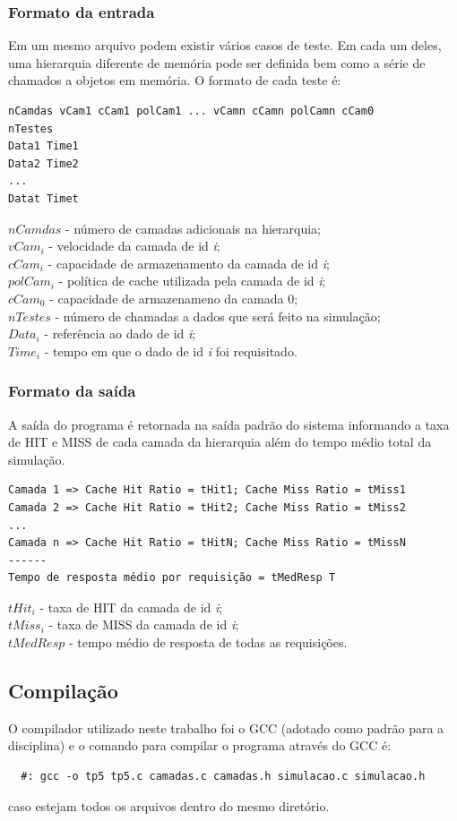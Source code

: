\documentclass[12pt]{article}
\begin{document}
\subsubsection{Formato da entrada}
Em um mesmo arquivo podem existir vários casos de teste. Em cada um deles, uma hierarquia diferente de memória pode ser definida bem como a série de chamados a objetos em memória. O formato de cada teste é:
\begin{verbatim}
nCamdas vCam1 cCam1 polCam1 ... vCamn cCamn polCamn cCam0
nTestes
Data1 Time1
Data2 Time2
...
Datat Timet
\end{verbatim}$nCamdas$ - número de camadas adicionais na hierarquia; \\
$vCam_{i}$ - velocidade da camada de id \textit{i}; \\
$cCam_{i}$ - capacidade de armazenamento da camada de id \textit{i}; \\
$polCam_{i}$ - política de cache utilizada pela camada de id \textit{i}; \\
$cCam_{0}$ - capacidade de armazenameno da camada 0; \\
$nTestes$ - número de chamadas a dados que será feito na simulação; \\
$Data_{i}$ - referência ao dado de id \textit{i}; \\
$Time_{i}$ - tempo em que o dado de id \textit{i} foi requisitado.

\subsubsection{Formato da saída}
A saída do programa é retornada na saída padrão do sistema informando a taxa de HIT e MISS de cada camada da hierarquia além do tempo médio total da simulação.
\begin{verbatim}
Camada 1 => Cache Hit Ratio = tHit1; Cache Miss Ratio = tMiss1
Camada 2 => Cache Hit Ratio = tHit2; Cache Miss Ratio = tMiss2
...
Camada n => Cache Hit Ratio = tHitN; Cache Miss Ratio = tMissN
------
Tempo de resposta médio por requisição = tMedResp T
\end{verbatim}$tHit_{i}$ - taxa de HIT da camada de id \textit{i}; \\
$tMiss_{i}$ - taxa de MISS da camada de id \textit{i}; \\
$tMedResp$ - tempo médio de resposta de todas as requisições.

\subsection{Compilação}
O compilador utilizado neste trabalho foi o GCC (adotado como padrão para a disciplina) e 
o comando para compilar o programa através do GCC é:
\begin{verbatim}
  #: gcc -o tp5 tp5.c camadas.c camadas.h simulacao.c simulacao.h
\end{verbatim}
caso estejam todos os arquivos dentro do mesmo diretório.
\end{document}
